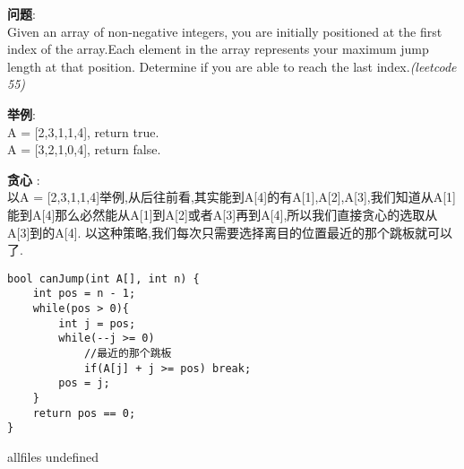 \documentclass{article}
\begin{document}
\begin{CJK}{UTF8}{gbsn}     %

\else
    
\begin{description}
    \item{\textbf{问题}}: \\
Given an array of non-negative integers, you are initially positioned at the first index of the array.Each element in the array represents your maximum jump length at that position. Determine if you are able to reach the last index.\textit{(leetcode 55)}

    \item{\textbf{举例}}: \\
A = [2,3,1,1,4], return true.\\
A = [3,2,1,0,4], return false.

    \item{\textbf{贪心}} : 
    \\以A = [2,3,1,1,4]举例,从后往前看,其实能到A[4]的有A[1],A[2],A[3],我们知道从A[1]能到A[4]那么必然能从A[1]到A[2]或者A[3]再到A[4],所以我们直接贪心的选取从A[3]到的A[4]. 以这种策略,我们每次只需要选择离目的位置最近的那个跳板就可以了.
    \begin{lstlisting}
bool canJump(int A[], int n) {
	int pos = n - 1;
	while(pos > 0){ 
		int j = pos;
		while(--j >= 0)
			//最近的那个跳板
			if(A[j] + j >= pos) break;
		pos = j;
	}
	return pos == 0;
}   
    \end{lstlisting}
\end{description}

\fi

\ifx allfiles undefined
\end{CJK}
\end{document}

